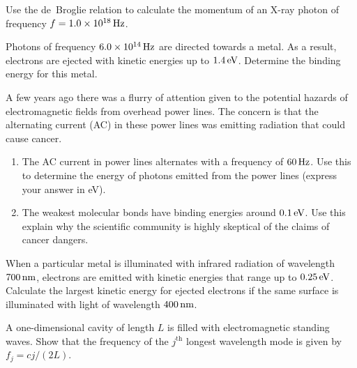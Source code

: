 \begin{problem}
Use the de~Broglie relation to calculate the momentum of an X-ray
photon of frequency $f=1.0\times 10^{18}\,\mbox{Hz}$.
\label{prob:deBmomentum}
\end{problem}

\begin{problem}
Photons of frequency $6.0\times 10^{14}\,\mbox{Hz}$ are directed
towards a metal.  As a result, electrons are ejected with kinetic
energies up to $1.4\,\mbox{eV}$.  Determine the binding energy for this
metal.
\label{prob:BindingEnergy}
\end{problem}

\begin{problem} %
A few years ago there was a flurry of attention given to the potential
hazards of electromagnetic fields from overhead power lines.  The
concern is that the alternating current (AC) in these power lines was
emitting radiation that could cause cancer.
\begin{enumerate}
\item The AC current in power lines alternates with a frequency of
  $60\,\mbox{Hz}$.  Use this to determine the energy of photons emitted
  from the power lines (express your answer in eV).
\item The weakest molecular bonds have binding energies around
  $0.1\,\mbox{eV}$.  Use this explain why the scientific community is
  highly skeptical of the claims of cancer dangers.
\end{enumerate}
\label{prob:EMFhazards}
\end{problem}

\begin{problem} %
When a particular metal is illuminated with infrared radiation of
wavelength $700\,\mbox{nm}$, electrons are emitted with kinetic
energies that range up to $0.25\,\mbox{eV}$.  Calculate the largest
kinetic energy for ejected electrons if the same surface is
illuminated with light of wavelength $400\,\mbox{nm}$.
\end{problem}

\begin{problem}
A one-dimensional cavity of length $L$ is filled with electromagnetic
standing waves.  Show that the frequency of the $j^\text{th}$ longest
wavelength mode is given by $f_j = cj/(2L)$.  
\label{prob:cavity_freq}
\end{problem}


